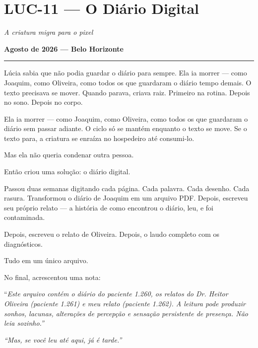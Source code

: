 \section*{\textbf{LUC-11} --- O Diário Digital}

\noindent \textit{A criatura migra para o pixel}

\noindent \textbf{Agosto de 2026 --- Belo Horizonte}

\vspace{0.5em}\noindent\rule{\textwidth}{0.5pt}\vspace{0.5em}

\noindent Lúcia sabia que não podia guardar o diário para sempre.
\noindent Ela ia morrer --- como Joaquim, como Oliveira, como todos os que guardaram o diário tempo demais. O texto precisava se mover. Quando parava, criava raiz. Primeiro na rotina. Depois no sono. Depois no corpo.

\noindent Ela ia morrer --- como Joaquim, como Oliveira, como todos os que guardaram o diário sem passar adiante. O ciclo só se mantém enquanto o texto se move. Se o texto para, a criatura se enraíza no hospedeiro até consumi-lo.

\noindent Mas ela não queria condenar outra pessoa.

\noindent Então criou uma solução: o diário digital.

\noindent Passou duas semanas digitando cada página. Cada palavra. Cada desenho. Cada rasura. Transformou o diário de Joaquim em um arquivo PDF. Depois, escreveu seu próprio relato --- a história de como encontrou o diário, leu, e foi contaminada.

\noindent Depois, escreveu o relato de Oliveira. Depois, o laudo completo com os diagnósticos.

\noindent Tudo em um único arquivo.

\noindent No final, acrescentou uma nota:

\noindent \textquotedblleft{\textit{Este arquivo contém o diário do paciente 1.260, os relatos do Dr. Heitor Oliveira (paciente 1.261) e meu relato (paciente 1.262). A leitura pode produzir sonhos, lacunas, alterações de percepção e sensação persistente de presença. Não leia sozinho.\textquotedblright{}}}

\noindent \textit{\textquotedblleft{}Mas, se você leu até aqui, já é tarde.\textquotedblright{}}

